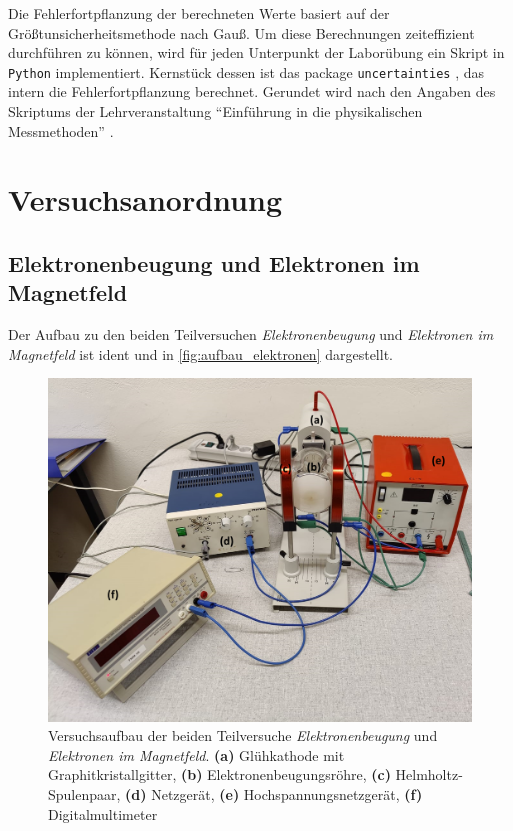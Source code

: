 \documentclass[ngerman]{scrartcl}
\begin{document}
Die Fehlerfortpflanzung der berechneten Werte basiert auf der Größtunsicherheitsmethode nach Gauß. Um diese Berechnungen zeiteffizient durchführen zu können, wird für jeden Unterpunkt der Laborübung ein Skript in \verb!Python! implementiert. Kernstück dessen ist das package \verb!uncertainties! \cite{ref:uncertainties}, das intern die Fehlerfortpflanzung berechnet. Gerundet wird nach den Angaben des Skriptums der Lehrveranstaltung \enquote{Einführung in die physikalischen Messmethoden} \cite{ref:messmethoden}.



\section{Versuchsanordnung}
\label{sec:versuchsanordnung}

\subsection{Elektronenbeugung und Elektronen im Magnetfeld}
\label{subsec:anordnung_elektronen}

Der Aufbau zu den beiden Teilversuchen \textit{Elektronenbeugung} und \textit{Elektronen im Magnetfeld} ist ident und in \autoref{fig:aufbau_elektronen} dargestellt.
%
\begin{figure}[H]
    \centering
    \begin{samepage}
        \includegraphics[width=0.8\linewidth]{fig/Beugung_Aufbau_beschriftet.png}
        \caption[Aufbau Elektronenbeugung und Elektronen im Magnetfeld]{Versuchsaufbau der beiden Teilversuche \textit{Elektronenbeugung} und \textit{Elektronen im Magnetfeld}. \textbf{(a)} Glühkathode mit Graphitkristallgitter, \textbf{(b)} Elektronenbeugungsröhre, \textbf{(c)} Helmholtz-Spulenpaar, \textbf{(d)} Netzgerät, \textbf{(e)} Hochspannungsnetzgerät, \textbf{(f)} Digitalmultimeter}
        \label{fig:aufbau_elektronen}
    \end{samepage}
\end{figure}
%
\end{document}
